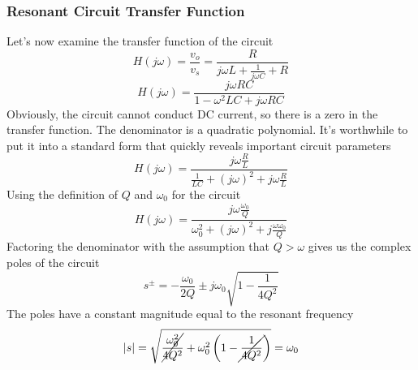 \subsubsection{Resonant Circuit Transfer Function}
Let's now examine the transfer function of the circuit
\begin{equation}
    H(j\omega) = \frac{v_o}{v_s} = \frac{R}{j\omega L + \frac{1}{j\omega C} +
      R}
\end{equation}
\begin{equation}
    H(j\omega) = \frac{j\omega R C }{1 - \omega^2 LC + j\omega R C}
\end{equation}
Obviously, the circuit cannot conduct DC current, so there is a zero in the transfer function.  The denominator is a quadratic polynomial.  It's worthwhile to put it into a standard form that quickly reveals important circuit parameters
    \begin{equation}
        H(j\omega) = \frac{j\omega \frac{R}{L} }{\frac{1}{LC} + (j\omega)^2 + j\omega \frac{R}{L}}
    \end{equation}
Using the definition of $Q$ and $\omega_0$ for the circuit
    \begin{equation}
        H(j\omega) = \frac{j\omega \frac{\omega_0}{Q} }{\omega_0^2 +  (j\omega)^2 + j \frac{\omega\omega_0}{Q}}
    \end{equation}
Factoring the denominator with the assumption that $Q > \omega$ gives us the complex poles of the circuit
    \begin{equation}
        s^\pm = -\frac{\omega_0}{2 Q} \pm j\omega_0 \sqrt{1 - \frac{1}{4Q^2}}
    \end{equation}
The poles have a constant magnitude equal to the resonant frequency
    \begin{equation}
        |s| = \sqrt{\cancel{\frac{\omega_0^2}{4 Q^2}} + \omega_0^2 \left(1 - \cancel{\frac{1}{4Q^2}} \right)} = \omega_0
    \end{equation}
